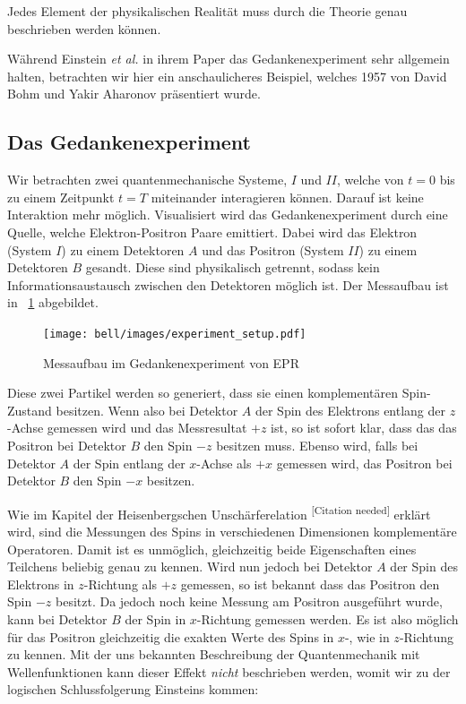 \begin{refsection}
\begin{definition}\label{def:Bell:Vollstaendigkeit}
    Jedes Element der physikalischen Realit\"at muss durch die Theorie
    genau beschrieben werden k\"onnen.
\end{definition}

W\"ahrend Einstein \emph{et al.} in ihrem Paper das Gedankenexperiment sehr
allgemein halten, betrachten wir hier ein anschaulicheres Beispiel, welches
1957 von David Bohm und Yakir Aharonov \cite{Bell:Bohm1957} pr\"asentiert wurde.

\subsection{Das Gedankenexperiment\label{subsection:bell:epr:experiment}}
Wir betrachten zwei quantenmechanische Systeme, $I$ und $II$,
welche von $t=0$ bis zu einem Zeitpunkt $t=T$ miteinander 
interagieren k\"onnen. Darauf ist keine Interaktion mehr m\"oglich.
Visualisiert wird das Gedankenexperiment durch eine Quelle, welche
Elektron-Positron Paare emittiert. 
Dabei wird das Elektron (System $I$) zu einem Detektoren $A$ und das 
Positron (System $II$) zu einem Detektoren $B$ gesandt.
Diese sind physikalisch getrennt, sodass kein Informationsaustausch
zwischen den Detektoren m\"oglich ist.
Der Messaufbau ist in \figurename~\ref{fig:bell:EPR_Messaufbau} abgebildet.

\begin{figure}
    \centering
    \texttt{[image: bell/images/experiment\_setup.pdf]}
    \caption{Messaufbau im Gedankenexperiment von EPR}
    \label{fig:bell:EPR_Messaufbau}
\end{figure}

Diese zwei Partikel werden so generiert, dass sie einen komplement\"aren
Spin-Zustand besitzen. 
Wenn also bei Detektor $A$ der Spin des Elektrons entlang der $z$-Achse
gemessen wird und das Messresultat $+z$ ist, so ist sofort klar, dass
das das Positron bei Detektor $B$ den Spin $-z$ besitzen muss. 
Ebenso wird, falls bei Detektor $A$ der Spin entlang der $x$-Achse als $+x$
gemessen wird, das Positron bei Detektor $B$ den Spin $-x$ besitzen.

Wie im Kapitel der Heisenbergschen Unsch\"arferelation
\textsuperscript{[Citation needed]}
erkl\"art wird, sind die Messungen des Spins in verschiedenen Dimensionen 
komplement\"are Operatoren.
Damit ist es unm\"oglich, gleichzeitig beide Eigenschaften eines Teilchens
beliebig genau zu kennen.
Wird nun jedoch bei Detektor $A$ der Spin des Elektrons in $z$-Richtung 
als $+z$ gemessen, so ist bekannt dass das Positron den Spin $-z$ besitzt.
Da jedoch noch keine Messung am Positron ausgef\"uhrt wurde, kann bei
Detektor $B$ der Spin in $x$-Richtung gemessen werden.
Es ist also m\"oglich f\"ur das Positron gleichzeitig die exakten Werte 
des Spins in $x$-, wie in $z$-Richtung zu kennen. 
Mit der uns bekannten Beschreibung der Quantenmechanik mit Wellenfunktionen
kann dieser Effekt \emph{nicht} beschrieben werden, womit wir zu der
logischen Schlussfolgerung Einsteins kommen:


\end{refsection}
